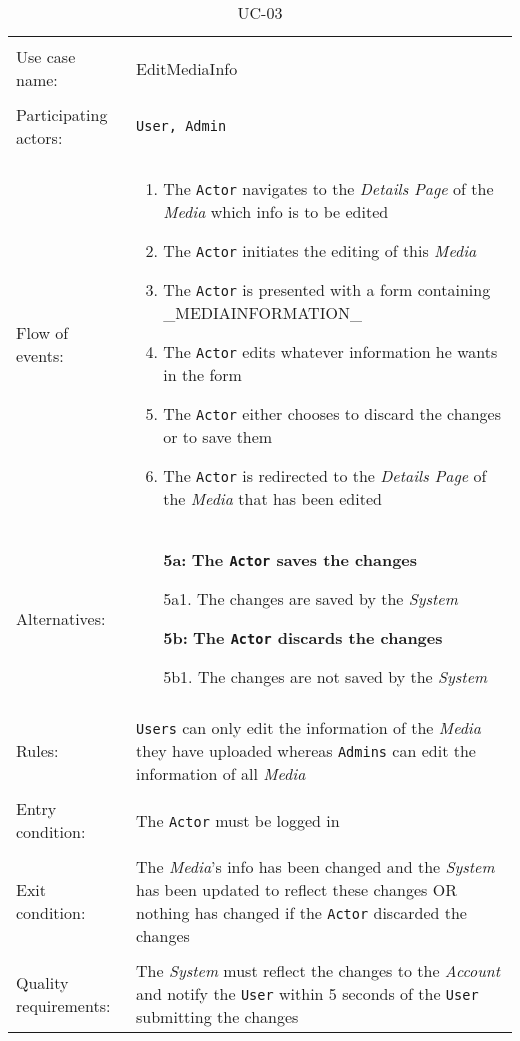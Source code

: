\documentclass[../report.tex]{subfiles}
\begin{document}
\noindent
\begin{table}
\caption{UC-03}
\label{UC-03}
\begin{tabular}{ l  p{8cm} }  
\hline
\\
Use case name:  & EditMediaInfo   \\   \hline    
\\            
Participating actors:  & \texttt{\texttt{User}, \texttt{Admin}} \\   \hline   
\\             
Flow of events: & \begin{enumerate}
\item{The \texttt{Actor} navigates to the \textit{Details Page} of the \textit{Media} which info is to be edited}
\item{The \texttt{Actor} initiates the editing of this \textit{Media}}
\item{The \texttt{Actor} is presented with a form containing \_MEDIAINFORMATION\_}
\item{The \texttt{Actor} edits whatever information he wants in the form}
\item{The \texttt{Actor} either chooses to discard the changes or to save them}
\item{The \texttt{Actor} is redirected to the \textit{Details Page} of the \textit{Media} that has been edited}
\end{enumerate}
\\
Alternatives: & \begin{itemize}
\item[\textbf{5a:}]{\textbf{The \texttt{Actor} saves the changes}}
\item[]  5a1. The changes are saved by the \textit{System}
\item[\textbf{5b:}]{\textbf{The \texttt{Actor} discards the changes}}
\item[]  5b1. The changes are not saved by the \textit{System}
\end{itemize}
\\ \hline
\\
Rules: & \texttt{Users} can only edit the information of the \textit{Media} they have uploaded whereas \texttt{Admins} can edit the information of all \textit{Media}
\\   \hline 
\\
Entry condition: & The \texttt{Actor} must be logged in \\ \hline
\\
Exit condition: & The \textit{Media}'s info has been changed and the \textit{System} has been updated to reflect these changes OR
nothing has changed if the \texttt{Actor} discarded the changes \\ \hline
\\
Quality requirements: & The \textit{System} must reflect the changes to the \textit{Account} and notify the \texttt{User} within 5 seconds of the \texttt{User} submitting the changes \\ \hline  
\end{tabular}
\end{table}
\end{document}
